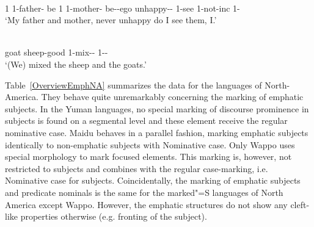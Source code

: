 \begin{exe}\ex\label{YavEmph}
\begin{xlist}
\raggedright
\ex\gll {} \textbf{}   \textbf{}      \textbf{}\\
1 1-father-\nom{} be 1 1-mother-\nom{} be-\conj{}-ego \Neg{} unhappy-\pl{}-\allo{} 1-see 1-not-inc 1-\nom{}\\
\glt `My father and mother, never unhappy do I see them, I.'

\ex\gll{}   \textbf{}\\
goat sheep-good 1-mix-\pl{}-\compl{} 1-\pl{}-\nom{}\\
\glt `(We) mixed the sheep and the goats.'
\end{xlist}\end{exe}

Table~\ref{OverviewEmphNA} summarizes the data for the languages of North-America.
They behave quite unremarkably concerning the marking of emphatic subjects.
In the Yuman languages, no special marking of discourse prominence in subjects is found on a segmental level and these element receive the regular nominative  case.
Maidu behaves in a parallel fashion, marking emphatic subjects identically to non-emphatic subjects with Nominative  case.
Only Wappo uses special morphology to mark focused elements. 
This marking is, however, not restricted to subjects and combines with the regular case-marking, i.e. Nominative case for subjects.
Coincidentally, the marking of emphatic subjects and predicate nominals is the same for the marked"=S languages of North America except Wappo.
However, the emphatic structures do not show any cleft-like properties otherwise (e.g. fronting of the subject).

